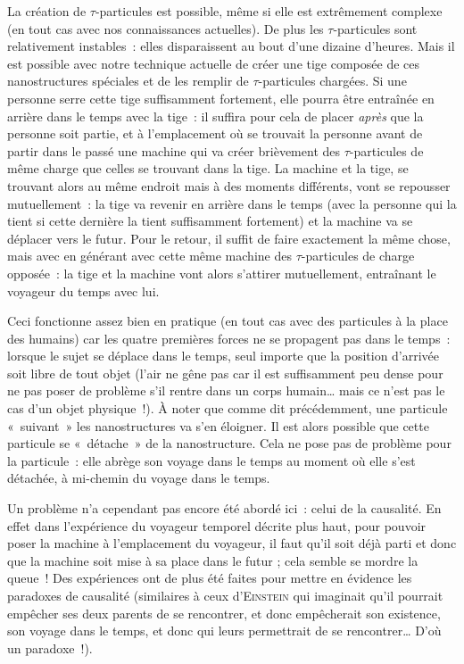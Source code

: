 {La création de $\tau$-particules est possible, même si elle est extrêmement complexe (en tout cas avec nos connaissances actuelles).
De plus les $\tau$-particules sont relativement instables~:  elles disparaissent au bout d’une dizaine d’heures.
Mais il est possible avec notre technique actuelle de créer une tige composée de ces nanostructures spéciales et de les remplir de $\tau$-particules chargées.
Si une personne serre cette tige suffisamment fortement, elle pourra être entraînée en arrière dans le temps avec la tige~:  il suffira pour cela de placer \emph{après} que la personne soit partie, et à l’emplacement où se trouvait la personne avant de partir dans le passé une machine qui va créer brièvement des $\tau$-particules de même charge que celles se trouvant dans la tige.
La machine et la tige, se trouvant alors au même endroit mais à des moments différents, vont se repousser mutuellement~:  la tige va revenir en arrière dans le temps (avec la personne qui la tient si cette dernière la tient suffisamment fortement) et la machine va se déplacer vers le futur.
Pour le retour, il suffit de faire exactement la même chose, mais avec en générant avec cette même machine des $\tau$-particules de charge opposée~:  la tige et la machine vont alors s’attirer mutuellement, entraînant le voyageur du temps avec lui.

Ceci fonctionne assez bien en pratique (en tout cas avec des particules à la place des humains) car les quatre premières forces ne se propagent pas dans le temps~:  lorsque le sujet se déplace dans le temps, seul importe que la position d’arrivée soit libre de tout objet (l’air ne gêne pas car il est suffisamment peu dense pour ne pas poser de problème s’il rentre dans un corps humain… mais ce n’est pas le cas d’un objet physique~!).
À noter que comme dit précédemment, une particule «~suivant~» les nanostructures va s’en éloigner.  Il est alors possible que cette particule se «~détache~» de la nanostructure.
Cela ne pose pas de problème pour la particule~:  elle abrège son voyage dans le temps au moment où elle s’est détachée, à mi-chemin du voyage dans le temps.

Un problème n’a cependant pas encore été abordé ici~:  celui de la causalité.
En effet dans l’expérience du voyageur temporel décrite plus haut, pour pouvoir poser la machine à l’emplacement du voyageur, il faut qu’il soit déjà parti et donc que la machine soit mise à sa place dans le futur ; cela semble se mordre la queue~!
Des expériences ont de plus été faites pour mettre en évidence les paradoxes de causalité (similaires à ceux d’\textsc{Einstein} qui imaginait qu’il pourrait empêcher ses deux parents de se rencontrer, et donc empêcherait son existence, son voyage dans le temps, et donc qui leurs permettrait de se rencontrer…  D’où un paradoxe~!).

}
